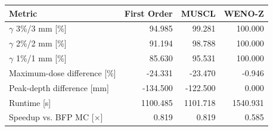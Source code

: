 \begin{tabular}{lrrr}
\toprule
Metric & First Order & MUSCL & WENO-Z \\
\midrule
$\gamma$ 3\%/3 mm [\%] & 94.985 & 99.281 & 100.000 \\
$\gamma$ 2\%/2 mm [\%] & 91.194 & 98.788 & 100.000 \\
$\gamma$ 1\%/1 mm [\%] & 85.630 & 95.531 & 100.000 \\
Maximum-dose difference [\%] & -24.331 & -23.470 & -0.946 \\
Peak-depth difference [mm] & -134.500 & -122.500 & 0.000 \\
Runtime [s] & 1100.485 & 1101.718 & 1540.931 \\
Speedup vs. BFP MC [$\times$] & 0.819 & 0.819 & 0.585 \\
\bottomrule
\end{tabular}
